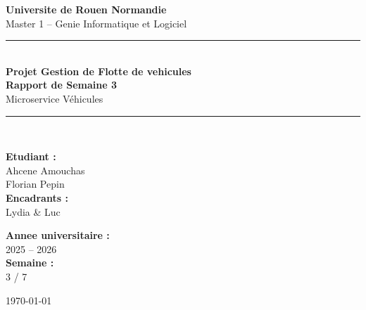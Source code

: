 \documentclass[12pt,a4paper]{article}
\begin{document}
\begin{titlepage}
  \centering
  \vspace*{1cm}

  {\Large\textbf{Universite de Rouen Normandie}\\[0.3cm]
  \large Master 1 -- Genie Informatique et Logiciel}

  \vspace{1.5cm}
  \rule{\linewidth}{0.5mm}\\[0.4cm]

  {\Huge\bfseries\color{primary} Projet Gestion de Flotte de vehicules\\[0.3cm]}
  {\LARGE\bfseries Rapport de Semaine 3}\\[0.3cm]
  {\large\color{darkgray} Microservice Véhicules}

  \rule{\linewidth}{0.5mm}\\[1.5cm]

  \begin{minipage}{0.45\textwidth}
    \begin{flushleft}
      \textbf{Etudiant :}\\
      Ahcene Amouchas \\
      Florian Pepin \\[0.5cm]
      \textbf{Encadrants :}\\
      Lydia \& Luc
    \end{flushleft}
  \end{minipage}
  \hfill
  \begin{minipage}{0.45\textwidth}
    \begin{flushright}
      \textbf{Annee universitaire :}\\
      2025 -- 2026\\[0.5cm]
      \textbf{Semaine :}\\
      3 / 7
    \end{flushright}
  \end{minipage}

  \vfill
  {\large\today}
\end{titlepage}

\tableofcontents
\newpage

\end{document}
